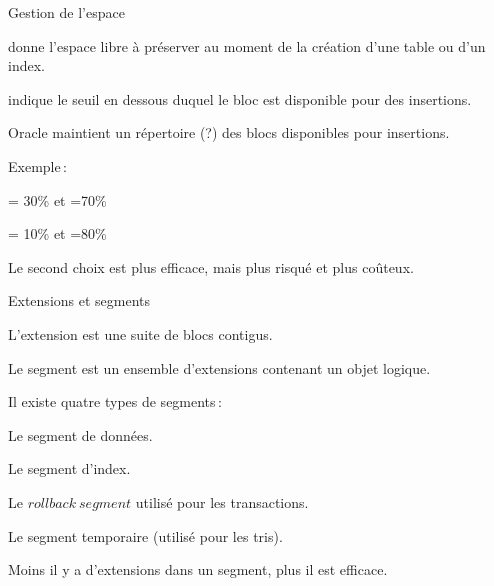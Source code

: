 \begin{frame}{Gestion de l'espace}

\begin{redbullet}
 \item {} donne l'espace libre à préserver 
  au moment de la création d'une table ou d'un index.

  \item  {} indique le seuil en dessous duquel  le bloc
              est disponible pour des insertions.
\end{redbullet}

Oracle maintient un répertoire (?) des blocs
disponibles pour insertions.

\vfill
 Exemple\,:

\begin{redbullet}
   \item  {} = 30\% et  =70\%
   \item  {} = 10\% et  =80\%
\end{redbullet}

Le second choix est plus efficace, mais plus risqué et plus coûteux.

\end{frame}


\begin{frame}{Extensions et segments}

\alert{L'extension} est une suite de blocs contigus.

\vfill

Le \alert{segment} est un ensemble d'extensions
 contenant un objet logique. 

Il existe quatre types de segments\,:
\begin{redbullet}
  \item Le segment de données.
  \item Le segment d'index.
  \item Le $rollback\ segment$ utilisé pour les transactions.
  \item Le segment temporaire (utilisé pour les tris).
\end{redbullet}

\vfill

Moins il y a d'extensions dans un segment, plus il
est efficace.

\end{frame}


